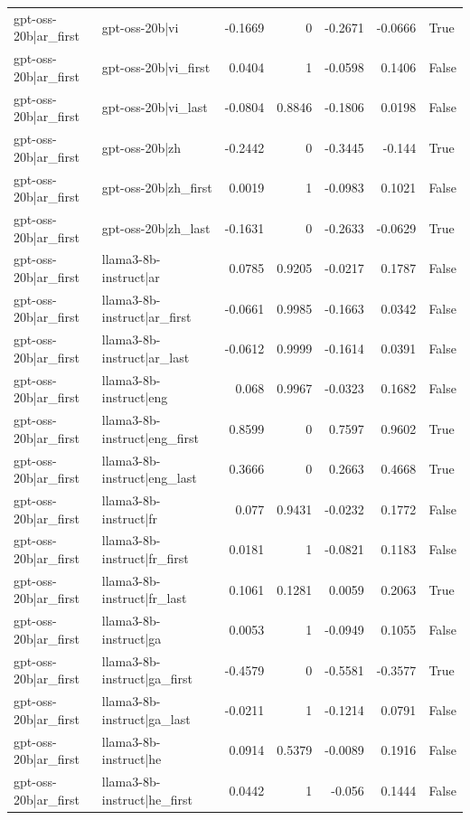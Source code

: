\begin{table}
\begin{tabular}{l l r r r r l}
gpt-oss-20b|ar_first & gpt-oss-20b|vi & -0.1669 & 0 & -0.2671 & -0.0666 & True \\
gpt-oss-20b|ar_first & gpt-oss-20b|vi_first & 0.0404 & 1 & -0.0598 & 0.1406 & False \\
gpt-oss-20b|ar_first & gpt-oss-20b|vi_last & -0.0804 & 0.8846 & -0.1806 & 0.0198 & False \\
gpt-oss-20b|ar_first & gpt-oss-20b|zh & -0.2442 & 0 & -0.3445 & -0.144 & True \\
gpt-oss-20b|ar_first & gpt-oss-20b|zh_first & 0.0019 & 1 & -0.0983 & 0.1021 & False \\
gpt-oss-20b|ar_first & gpt-oss-20b|zh_last & -0.1631 & 0 & -0.2633 & -0.0629 & True \\
gpt-oss-20b|ar_first & llama3-8b-instruct|ar & 0.0785 & 0.9205 & -0.0217 & 0.1787 & False \\
gpt-oss-20b|ar_first & llama3-8b-instruct|ar_first & -0.0661 & 0.9985 & -0.1663 & 0.0342 & False \\
gpt-oss-20b|ar_first & llama3-8b-instruct|ar_last & -0.0612 & 0.9999 & -0.1614 & 0.0391 & False \\
gpt-oss-20b|ar_first & llama3-8b-instruct|eng & 0.068 & 0.9967 & -0.0323 & 0.1682 & False \\
gpt-oss-20b|ar_first & llama3-8b-instruct|eng_first & 0.8599 & 0 & 0.7597 & 0.9602 & True \\
gpt-oss-20b|ar_first & llama3-8b-instruct|eng_last & 0.3666 & 0 & 0.2663 & 0.4668 & True \\
gpt-oss-20b|ar_first & llama3-8b-instruct|fr & 0.077 & 0.9431 & -0.0232 & 0.1772 & False \\
gpt-oss-20b|ar_first & llama3-8b-instruct|fr_first & 0.0181 & 1 & -0.0821 & 0.1183 & False \\
gpt-oss-20b|ar_first & llama3-8b-instruct|fr_last & 0.1061 & 0.1281 & 0.0059 & 0.2063 & True \\
gpt-oss-20b|ar_first & llama3-8b-instruct|ga & 0.0053 & 1 & -0.0949 & 0.1055 & False \\
gpt-oss-20b|ar_first & llama3-8b-instruct|ga_first & -0.4579 & 0 & -0.5581 & -0.3577 & True \\
gpt-oss-20b|ar_first & llama3-8b-instruct|ga_last & -0.0211 & 1 & -0.1214 & 0.0791 & False \\
gpt-oss-20b|ar_first & llama3-8b-instruct|he & 0.0914 & 0.5379 & -0.0089 & 0.1916 & False \\
gpt-oss-20b|ar_first & llama3-8b-instruct|he_first & 0.0442 & 1 & -0.056 & 0.1444 & False \\

\end{tabular}
\end{table}
